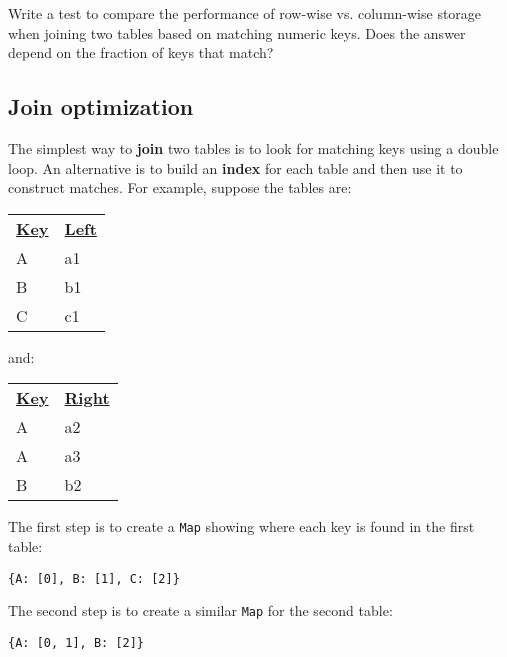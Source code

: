 \documentclass{scrbook}
\newcommand{\glossref}[1]{\textbf{#1}}
\begin{document}
\vspace{\baselineskip}


Write a test to compare the performance of row-wise vs. column-wise storage
when joining two tables based on matching numeric keys.
Does the answer depend on the fraction of keys that match?

\subsection*{Join optimization}


The simplest way to \glossref{join} two tables is
to look for matching keys using a double loop.
An alternative is to build an \glossref{index} for each table
and then use it to construct matches.
For example, suppose the tables are:


\vspace{\baselineskip}
\begin{tabular}{ll}
\textbf{\underline{Key}} & \textbf{\underline{Left}} \\
A & a1 \\
B & b1 \\
C & c1 \\
\end{tabular}

\vspace{\baselineskip}


\noindent and:


\vspace{\baselineskip}
\begin{tabular}{ll}
\textbf{\underline{Key}} & \textbf{\underline{Right}} \\
A & a2 \\
A & a3 \\
B & b2 \\
\end{tabular}

\vspace{\baselineskip}


The first step is to create a \texttt{Map} showing where each key is found in the first table:

\begin{lstlisting}[frame=single,frameround=tttt]
{A: [0], B: [1], C: [2]}
\end{lstlisting}


\noindent The second step is to create a similar \texttt{Map} for the second table:

\begin{lstlisting}[frame=single,frameround=tttt]
{A: [0, 1], B: [2]}
\end{lstlisting}
\end{document}
